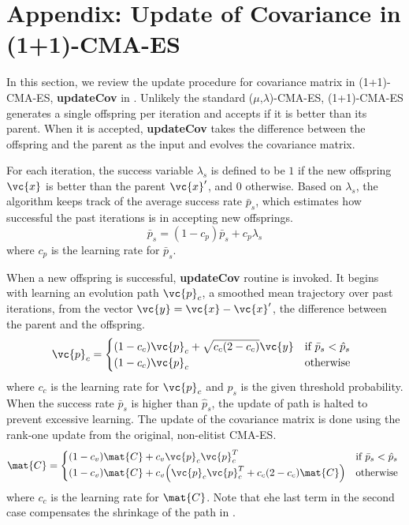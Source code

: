 \section*{Appendix: Update of Covariance in (1+1)-CMA-ES}
\label{sec:optskills_appendix}

In this section, we review the update procedure for covariance matrix
in (1+1)-CMA-ES, \textbf{updateCov} in \cite{Igel:2006:CEG}.  Unlikely
the standard ($\mu$,$\lambda$)-CMA-ES, (1+1)-CMA-ES generates a single
offspring per iteration and accepts if it is better than its parent.
When it is accepted, \textbf{updateCov} takes the difference between
the offspring and the parent as the input and evolves the covariance
matrix.

For each iteration, the success variable $\lambda_s$ is defined to be $1$
  if the new offspring $\vc{x}$ is better than the parent $\vc{x}'$, and $0$
  otherwise.  
  Based on $\lambda_s$, the algorithm keeps track of the average success rate
  $\bar{p}_s$, which estimates how successful the past iterations is
  in accepting new offsprings.
  \begin{equation}
    \bar{p}_s = (1 - c_p)\bar{p}_s + c_p \lambda_s
  \end{equation}
  where $c_p$ is the learning rate for $\bar{p}_s$.

When a new offspring is successful, \textbf{updateCov} routine is invoked.
  It begins with learning an evolution path $\vc{p}_c$, a smoothed mean
  trajectory over past iterations, from the vector
  $\vc{y}=\vc{x}-\vc{x}'$, the difference between the parent and the offspring. 
  \begin{equation}
    \vc{p}_c =\begin{cases} 
      (1 - c_c) \vc{p}_c + \sqrt{c_c(2-c_c)} \vc{y} & \text{if } \bar{p}_{s} <
    \hat{p}_{s} \\
      (1 - c_c) \vc{p}_c & \text{otherwise }
    \end{cases} \\
    \label{eq:optskills_cma_path}
  \end{equation}  
  where $c_c$ is the learning rate for $\vc{p}_c$ and $\hat{p}_s$ is the given
  threshold probability.
  When the success rate $\bar{p}_s$ is higher than $\hat{p}_s$, the update of
  path is halted to prevent excessive learning.
  The update of the covariance matrix is done using the rank-one update from
  the original, non-elitist CMA-ES.
  \begin{equation}
    \mat{C} = \begin{cases} 
      (1 - c_{v}) \mat{C} + c_{v} \vc{p}_c\vc{p}_c^T & \text{if } \bar{p}_{s} < \hat{p}_{s}\\
      (1 - c_{v}) \mat{C} + c_{v} \Big(\vc{p}_c\vc{p}_c^T  + 
      c_c(2-c_c)\mat{C} \Big) & \text{otherwise } 
    \end{cases}
  \end{equation}  
  where $c_c$ is the learning rate for $\mat{C}$.
  Note that ehe last term in the second case compensates the shrinkage of the path in
  . 
  
